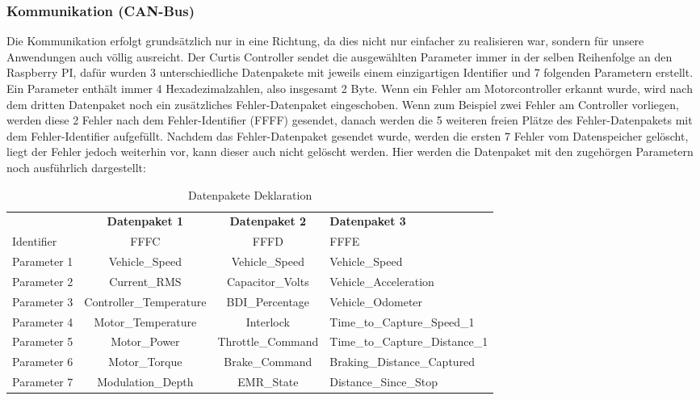 \newpage

\subsubsection{Kommunikation (CAN-Bus)}
Die Kommunikation erfolgt grundsätzlich nur in eine Richtung, da dies nicht nur einfacher zu realisieren war, sondern für unsere Anwendungen auch völlig ausreicht. Der Curtis Controller sendet die ausgewählten Parameter immer in der selben Reihenfolge an den Raspberry PI, dafür wurden 3 unterschiedliche Datenpakete mit jeweils einem einzigartigen Identifier und 7 folgenden Parametern erstellt. Ein Parameter enthält immer 4 Hexadezimalzahlen, also insgesamt 2 Byte. Wenn ein Fehler am Motorcontroller erkannt wurde, wird nach dem dritten Datenpaket noch ein zusätzliches Fehler-Datenpaket eingeschoben. Wenn zum Beispiel zwei Fehler am Controller vorliegen, werden diese 2 Fehler nach dem Fehler-Identifier (FFFF) gesendet, danach werden die 5 weiteren freien Plätze des Fehler-Datenpakets mit dem Fehler-Identifier aufgefüllt. Nachdem das Fehler-Datenpaket gesendet wurde, werden die ersten 7 Fehler vom Datenspeicher gelöscht, liegt der Fehler jedoch weiterhin vor, kann dieser auch nicht gelöscht werden. Hier werden die Datenpaket mit den zugehörgen Parametern noch ausführlich dargestellt:

\setlength{\tabcolsep}{9pt}
\begin{table}[H]
	\begin{tabular}{|lcc>{\centering\arraybackslash}p{5cm}|}\hline
	\rowcolor[gray]{0.8} & \textbf{Datenpaket 1} & \textbf{Datenpaket 2} & \textbf{Datenpaket 3}\\[3pt]
		Identifier	& FFFC & FFFD & FFFE\\\hline
		Parameter 1 & Vehicle\_Speed & Vehicle\_Speed & Vehicle\_Speed\\\hline
		Parameter 2 & Current\_RMS	& Capacitor\_Volts & Vehicle\_Acceleration\\\hline
		Parameter 3 & Controller\_Temperature & BDI\_Percentage & Vehicle\_Odometer\\\hline
		Parameter 4 & Motor\_Temperature	& Interlock	& Time\_to\_Capture\_Speed\_1\\\hline		
		Parameter 5	& Motor\_Power 	& Throttle\_Command & Time\_to\_Capture\_Distance\_1\\\hline
		Parameter 6	& Motor\_Torque 	& Brake\_Command	& Braking\_Distance\_Captured\\\hline
		Parameter 7 & Modulation\_Depth & EMR\_State & Distance\_Since\_Stop\\\hline		
	\end{tabular}	
	\caption{Datenpakete Deklaration}
	\label{tab:Datenpakete_Deklaration}
\end{table}

